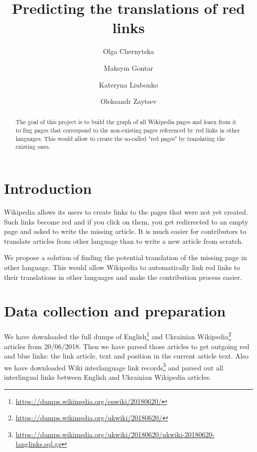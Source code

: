 \documentclass[11pt,a4paper]{article}
\begin{document}
\title{Predicting the translations of red links}
\date{}

\author[ ]{Olga Chernytska}
\author[ ]{Maksym Gontar}
\author[ ]{Kateryna Liubonko}
\author[ ]{Oleksandr Zaytsev}


\maketitle

\begin{abstract}
The goal of this project is to build the graph of all Wikipedia pages and learn from it to fing pages that correspond to the non-existing pages referenced by red links in other languages. This would allow to create the so-called "red pages" by translating the existing ones.
\end{abstract}

\section{Introduction}

Wikipedia allows its users to create links to the pages that were not yet created. Such links become red and if you click on them, you get redirrected to an empty page and asked to write the missing article. It is much easier for contributors to translate articles from other language than to write a new article from scratch.

We propose a solution of finding the potential translation of the missing page in other language. This would allow Wikipedia to automatically link red links to their translations in other languages and make the contribution process easier.

\section{Data collection and preparation}

We have downloaded the full dumps of English\footnote{\url{https://dumps.wikimedia.org/enwiki/20180620/}} and Ukrainian Wikipedia\footnote{\url{https://dumps.wikimedia.org/ukwiki/20180620/}} articles from 20/06/2018. Then we have parsed those articles to get outgoing red and blue links: the link article, text and position in the current article text. Also we have downloaded Wiki interlanguage link records\footnote{\url{https://dumps.wikimedia.org/ukwiki/20180620/ukwiki-20180620-langlinks.sql.gz}} and parsed out all interlingual links between English and Ukrainian Wikipedia articles.
\end{document}
